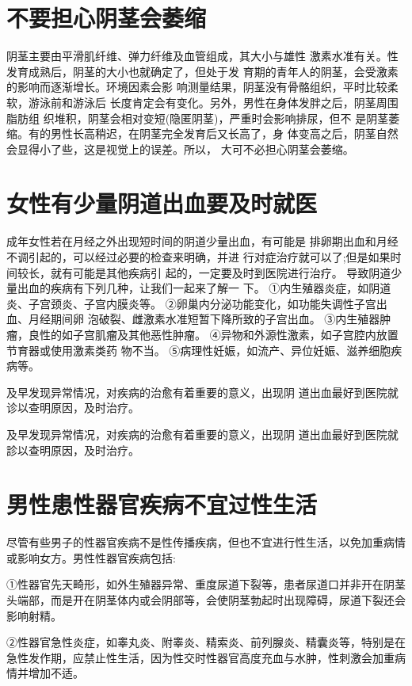 \documentclass[12pt,UTF8]{ctexbook}
\begin{document}
\section{不要担心阴茎会萎缩}
阴茎主要由平滑肌纤维、弹力纤维及血管组成，其大小与雄性
激素水准有关。性发育成熟后，阴茎的大小也就确定了，但处于发
育期的青年人的阴茎，会受激素的影响而逐渐增长。环境因素会影
响测量结果，阴茎没有骨骼组织，平时比较柔软，游泳前和游泳后
长度肯定会有变化。另外，男性在身体发胖之后，阴茎周围脂肪组
织堆积，阴茎会相对变短(隐匿阴茎)，严重时会影响排尿，但不
是阴茎萎缩。有的男性长高稍迟，在阴茎完全发育后又长高了，身
体变高之后，阴茎自然会显得小了些，这是视觉上的误差。所以，
大可不必担心阴茎会萎缩。

\section{女性有少量阴道出血要及时就医}

成年女性若在月经之外出现短时间的阴道少量出血，有可能是
排卵期出血和月经不调引起的，可以经过必要的检查来明确，并进
行对症治疗就可以了;但是如果时间较长，就有可能是其他疾病引
起的，一定要及时到医院进行治疗。
导致阴道少量出血的疾病有下列几种，让我们一起来了解一
下。
①内生殖器炎症，如阴道炎、子宫颈炎、子宫内膜炎等。
②卵巢内分泌功能变化，如功能失调性子宫出血、月经期间卵
泡破裂、雌激素水准短暂下降所致的子宫出血。
③内生殖器肿瘤，良性的如子宫肌瘤及其他恶性肿瘤。
④异物和外源性激素，如子宫腔内放置节育器或使用激素类药
物不当。
⑤病理性妊娠，如流产、异位妊娠、滋养细胞疾病等。

及早发现异常情况，对疾病的治愈有着重要的意义，出现阴
道出血最好到医院就诊以查明原因，及时治疗。

及早发现异常情况，对疾病的治愈有着重要的意义，出现阴
道出血最好到医院就診以查明原因，及时治疗。

\section{男性患性器官疾病不宜过性生活}

尽管有些男子的性器官疾病不是性传播疾病，但也不宜进行性生活，以免加重病情或影响女方。男性性器官疾病包括:

①性器官先天畸形，如外生殖器异常、重度尿道下裂等，患者尿道口并非开在阴茎头端部，而是开在阴茎体内或会阴部等，会使阴茎勃起时出现障碍，尿道下裂还会影响射精。

②性器官急性炎症，如睾丸炎、附睾炎、精索炎、前列腺炎、精囊炎等，特别是在急性发作期，应禁止性生活，因为性交时性器官高度充血与水肿，性刺激会加重病情并增加不适。
\end{document}
